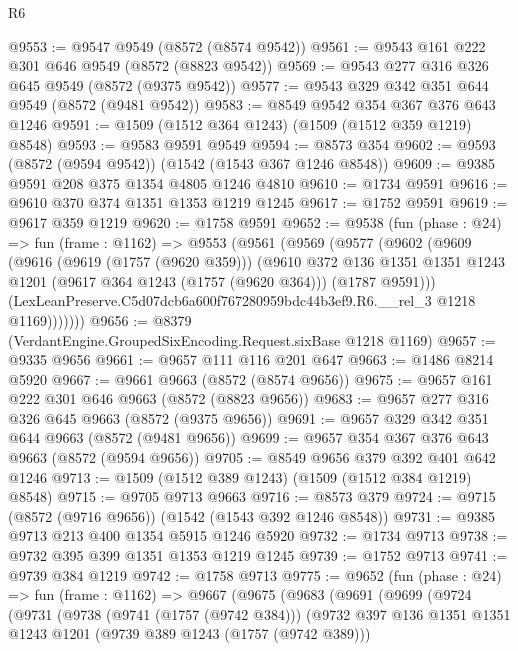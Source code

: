 \begin{lexlean}{R6}
\begin{coremodule}
@9553 := @9547 @9549 (@8572 (@8574 @9542))
@9561 := @9543 @161 @222 @301 @646 @9549 (@8572 (@8823 @9542))
@9569 := @9543 @277 @316 @326 @645 @9549 (@8572 (@9375 @9542))
@9577 := @9543 @329 @342 @351 @644 @9549 (@8572 (@9481 @9542))
@9583 := @8549 @9542 @354 @367 @376 @643 @1246
@9591 := @1509 (@1512 @364 @1243) (@1509 (@1512 @359 @1219) @8548)
@9593 := @9583 @9591 @9549
@9594 := @8573 @354
@9602 := @9593 (@8572 (@9594 @9542)) (@1542 (@1543 @367 @1246 @8548))
@9609 := @9385 @9591 @208 @375 @1354 @4805 @1246 @4810
@9610 := @1734 @9591
@9616 := @9610 @370 @374 @1351 @1353 @1219 @1245
@9617 := @1752 @9591
@9619 := @9617 @359 @1219
@9620 := @1758 @9591
@9652 := @9538
    (fun (phase : @24) =>
    fun (frame : @1162) =>
    @9553
      (@9561
        (@9569
          (@9577
            (@9602
              (@9609
                (@9616
                  (@9619 (@1757 (@9620 @359)))
                  (@9610
                    @372
                    @136
                    @1351
                    @1351
                    @1243
                    @1201
                    (@9617 @364 @1243 (@1757 (@9620 @364)))
                    (@1787 @9591)))
                (LexLeanPreserve.C5d07dcb6a600f767280959bdc44b3ef9.R6.__rel_3 @1218 @1169)))))))
@9656 := @8379 (VerdantEngine.GroupedSixEncoding.Request.sixBase @1218 @1169)
@9657 := @9335 @9656
@9661 := @9657 @111 @116 @201 @647
@9663 := @1486 @8214 @5920
@9667 := @9661 @9663 (@8572 (@8574 @9656))
@9675 := @9657 @161 @222 @301 @646 @9663 (@8572 (@8823 @9656))
@9683 := @9657 @277 @316 @326 @645 @9663 (@8572 (@9375 @9656))
@9691 := @9657 @329 @342 @351 @644 @9663 (@8572 (@9481 @9656))
@9699 := @9657 @354 @367 @376 @643 @9663 (@8572 (@9594 @9656))
@9705 := @8549 @9656 @379 @392 @401 @642 @1246
@9713 := @1509 (@1512 @389 @1243) (@1509 (@1512 @384 @1219) @8548)
@9715 := @9705 @9713 @9663
@9716 := @8573 @379
@9724 := @9715 (@8572 (@9716 @9656)) (@1542 (@1543 @392 @1246 @8548))
@9731 := @9385 @9713 @213 @400 @1354 @5915 @1246 @5920
@9732 := @1734 @9713
@9738 := @9732 @395 @399 @1351 @1353 @1219 @1245
@9739 := @1752 @9713
@9741 := @9739 @384 @1219
@9742 := @1758 @9713
@9775 := @9652
    (fun (phase : @24) =>
    fun (frame : @1162) =>
    @9667
      (@9675
        (@9683
          (@9691
            (@9699
              (@9724
                (@9731
                  (@9738
                    (@9741 (@1757 (@9742 @384)))
                    (@9732
                      @397
                      @136
                      @1351
                      @1351
                      @1243
                      @1201
                      (@9739 @389 @1243 (@1757 (@9742 @389)))

\end{coremodule}
\end{lexlean}
